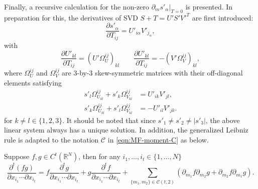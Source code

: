 Finally, a recursive calculation for the non-zero $\left.\partial_m s'_\alpha\right|_{T=0}$ is presented.
In preparation for this, the derivatives of SVD \cite{papadopoulo2000estimating} $S+T = U'S'V'^T$ are first introduced:
\begin{equation} \label{eqn:dsvd-dsdT}
	\frac{\partial s'_\alpha}{\partial T_{ij}} = U'_{i\alpha}V'_{j_\alpha},
\end{equation}
with
\begin{equation} \label{eqn:dsvd-dUVdT}
	\frac{\partial U'_{kl}}{\partial T_{ij}} = \left( U'\Omega_U^{ij} \right)_{kl} \qquad
	\frac{\partial U'_{kl}}{\partial T_{ij}} = -\left( V'\Omega_V^{ij} \right)_{kl},
\end{equation}
where $\Omega_U^{ij}$ and $\Omega_V^{ij}$ are 3-by-3 skew-symmetric matrices with their off-diagonal elements satisfying
\begin{align} \label{eqn:dsvd-OmegaUV}
	s'_l\Omega_{U_{kl}}^{ij} + s'_k\Omega_{V_{kl}}^{ij} &= U'_{ik}V'_{jl}, \nonumber \\
	s'_k\Omega_{U_{kl}}^{ij} + s'_l\Omega_{V_{kl}}^{ij} &= -U'_{il}V'_{jk}.
\end{align}
for $k\neq l \in\{1,2,3\}$.
It should be noted that since $s'_1 \neq s'_2 \neq |s'_3|$, the above linear system always has a unique solution.
In addition, the generalized Leibniz rule is adapted to the notation $\mathcal{C}$ in \eqref{eqn:MF-moment-C} as below.
\begin{lemma} \label{lemma:Leibniz}
	Suppose $f,g\in C^t(\mathbb{R}^N)$, then for any $i_1,\ldots,i_t\in\{1,\ldots,N\}$
	\begin{equation}
		\frac{\partial^t (fg)}{\partial x_{i_1} \cdots \partial x_{i_t}} = f\frac{\partial^t g}{\partial x_{i_1} \cdots \partial x_{i_t}} + g\frac{\partial^t f}{\partial x_{i_1} \cdots \partial x_{i_t}} + \sum_{\{m_1,m_2\}\in\mathcal{C}(t,2)} \left( \partial_{m_1}f\partial_{m_2}g + \partial_{m_2}f\partial_{m_1}g \right).
	\end{equation}
\end{lemma}

